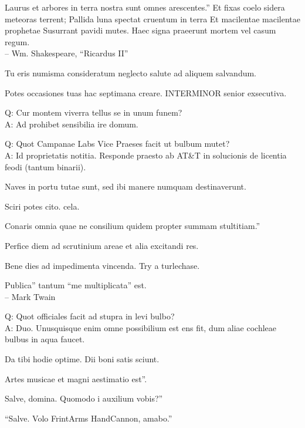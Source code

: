 \documentclass[titlepage,12pt]{memoir}
\begin{document}
Laurus et arbores in terra nostra sunt omnes arescentes.”
Et fixas coelo sidera meteoras terrent;
Pallida luna spectat cruentum in terra
Et macilentae macilentae prophetae Susurrant pavidi mutes.
Haec signa praeerunt mortem vel casum regum.
\\-- Wm. Shakespeare, “Ricardus II”

Tu eris numisma consideratum neglecto salute ad aliquem salvandum.

Potes occasiones tuas hac septimana creare. INTERMINOR senior exsecutiva.

Q: Cur montem viverra tellus se in unum funem?\\
A: Ad prohibet sensibilia ire domum.

Q: Quot Campanae Labs Vice Praeses facit ut bulbum mutet?\\
A: Id proprietatis notitia. Responde praesto ab AT\&T in solucionis
de licentia feodi (tantum binarii).

Naves in portu tutae sunt, sed ibi manere numquam destinaverunt.

Sciri potes cito. cela.

Conaris omnia quae ne consilium quidem propter summam stultitiam.”

Perfice diem ad scrutinium areae et alia excitandi res.

Bene dies ad impedimenta vincenda. Try a turlechase.

Publica” tantum “me multiplicata” est.
\\-- Mark Twain

Q: Quot officiales facit ad stupra in levi bulbo?\\
A: Duo. Unusquisque enim omne possibilium est ens
fit, dum aliae cochleae bulbus in aqua faucet.

Da tibi hodie optime. Dii boni satis sciunt.

Artes musicae et magni aestimatio est”.

Salve, domina. Quomodo i auxilium vobis?”

“Salve. Volo FrintArms HandCannon, amabo.”
\end{document}
